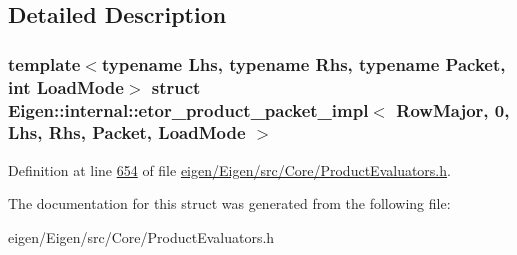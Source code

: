 \subsection{Detailed Description}
\subsubsection*{template$<$typename Lhs, typename Rhs, typename Packet, int Load\+Mode$>$\newline
struct Eigen\+::internal\+::etor\+\_\+product\+\_\+packet\+\_\+impl$<$ Row\+Major, 0, Lhs, Rhs, Packet, Load\+Mode $>$}



Definition at line \hyperlink{eigen_2_eigen_2src_2_core_2_product_evaluators_8h_source_l00654}{654} of file \hyperlink{eigen_2_eigen_2src_2_core_2_product_evaluators_8h_source}{eigen/\+Eigen/src/\+Core/\+Product\+Evaluators.\+h}.



The documentation for this struct was generated from the following file\+:\begin{DoxyCompactItemize}
\item 
eigen/\+Eigen/src/\+Core/\+Product\+Evaluators.\+h\end{DoxyCompactItemize}
